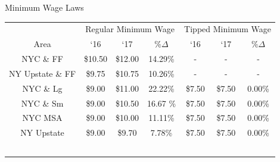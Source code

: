 \documentclass[xcolor=table]{beamer}
\begin{document}
\begin{spacing}{1.2}
\begin{frame}{Minimum Wage Laws}
\footnotesize
\centering
\begin{tabular}{ c c c c c c c} \\ \hline \hline
&  \multicolumn{3}{c}{Regular Minimum Wage} & \multicolumn{3}{c}{Tipped Minimum Wage}\\
 Area & `16  & `17  & $\% \Delta$ & `16 & `17 &  $\% \Delta$  \\ \hline \hline
 NYC \& FF & \$10.50 & \$12.00 & 14.29\%& - & - & - \\
 NY Upstate \& FF  & \$9.75 & \$10.75 & 10.26\% & - & -& - \\
\rowcolor{yellow}NYC \& Lg & \$9.00 & \$11.00 & 22.22\% & \$7.50 & \$7.50 & 0.00\%\\
\rowcolor{yellow}NYC \& Sm & \$9.00 & \$10.50 & 16.67 \% & \$7.50 & \$7.50 & 0.00\%\\
\rowcolor{yellow}NYC MSA & \$9.00 & \$10.00 & 11.11\% & \$7.50 & \$7.50 & 0.00\%\\
\rowcolor{yellow}NY Upstate & \$9.00 & \$9.70 & 7.78\% & \$7.50 & \$7.50  & 0.00\% \\
\\
\\
\\
\\
\\
\end{tabular}
\end{frame}


\end{spacing}
\end{document}
